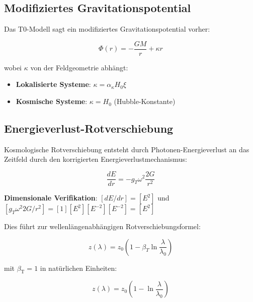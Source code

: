 \documentclass[12pt,a4paper]{article}
\newcommand{\betaT}{\beta_{\text{T}}}
\theoremstyle{definition}
\theoremstyle{remark}
\begin{document}
	\subsection{Modifiziertes Gravitationspotential}
	\label{subsec:modifiziertes_potential}
	
	Das T0-Modell sagt ein modifiziertes Gravitationspotential vorher:
	
	\begin{equation}
		\Phi(r) = -\frac{GM}{r} + \kappa r
		\label{eq:modifiziertes_gravitationspotential}
	\end{equation}
	
	wobei $\kappa$ von der Feldgeometrie abhängt:
	\begin{itemize}
		\item \textbf{Lokalisierte Systeme}: $\kappa = \alpha_\kappa H_0 \xi$
		\item \textbf{Kosmische Systeme}: $\kappa = H_0$ (Hubble-Konstante)
	\end{itemize}
	
	\subsection{Energieverlust-Rotverschiebung}
	\label{subsec:energieverlust_rotverschiebung}
	
	Kosmologische Rotverschiebung entsteht durch Photonen-Energieverlust an das Zeitfeld durch den korrigierten Energieverlustmechanismus:
	
	\begin{equation}
		\frac{dE}{dr} = -g_T \omega^2 \frac{2G}{r^2}
		\label{eq:energieverlust_rate}
	\end{equation}
	
	\textbf{Dimensionale Verifikation}: $[dE/dr] = [E^2]$ und $[g_T \omega^2 2G/r^2] = [1][E^2][E^{-2}][E^{-2}] = [E^2]$ \checkmark
	
	Dies führt zur wellenlängenabhängigen Rotverschiebungsformel:
	
	\begin{equation}
		\boxed{z(\lambda) = z_0\left(1 - \beta_T \ln\frac{\lambda}{\lambda_0}\right)}
		\label{eq:korrigierte_wellenlaenge_rotverschiebung}
	\end{equation}
	
	mit $\betaT = 1$ in natürlichen Einheiten:
	
	\begin{equation}
		\boxed{z(\lambda) = z_0\left(1 - \ln\frac{\lambda}{\lambda_0}\right)}
		\label{eq:korrigierte_rotverschiebung_nat_einheiten}
	\end{equation}
	
\end{document}
